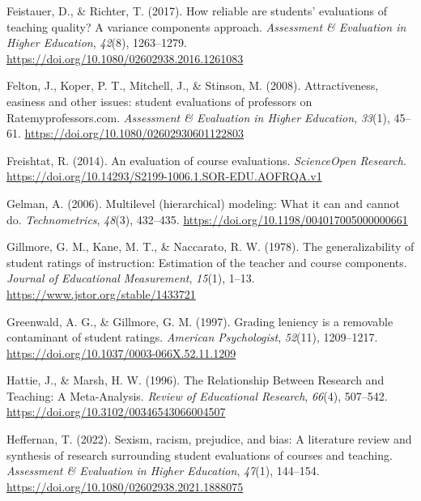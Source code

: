 \documentclass[
  man]{apa7}
\newlength{\cslhangindent}
\newlength{\cslentryspacingunit} %
\newenvironment{CSLReferences}[2] %
 {%
  \setlength{\parindent}{0pt}
  \ifodd #1
  \let\oldpar\par
  \def\par{\hangindent=\cslhangindent\oldpar}
  \fi
  \setlength{\parskip}{#2\cslentryspacingunit}
 }%
 {}
\begin{document}
\begin{CSLReferences}{1}{0}
\leavevmode{}%
Feistauer, D., \& Richter, T. (2017). How reliable are students{'} evaluations of teaching quality? A variance components approach. \emph{Assessment \& Evaluation in Higher Education}, \emph{42}(8), 1263--1279. \url{https://doi.org/10.1080/02602938.2016.1261083}

\leavevmode{}%
Felton, J., Koper, P. T., Mitchell, J., \& Stinson, M. (2008). Attractiveness, easiness and other issues: student evaluations of professors on Ratemyprofessors.com. \emph{Assessment \& Evaluation in Higher Education}, \emph{33}(1), 45--61. \url{https://doi.org/10.1080/02602930601122803}

\leavevmode{}%
Freishtat, R. (2014). An evaluation of course evaluations. \emph{ScienceOpen Research}. \url{https://doi.org/10.14293/S2199-1006.1.SOR-EDU.AOFRQA.v1}

\leavevmode{}%
Gelman, A. (2006). Multilevel (hierarchical) modeling: What it can and cannot do. \emph{Technometrics}, \emph{48}(3), 432--435. \url{https://doi.org/10.1198/004017005000000661}

\leavevmode{}%
Gillmore, G. M., Kane, M. T., \& Naccarato, R. W. (1978). The generalizability of student ratings of instruction: Estimation of the teacher and course components. \emph{Journal of Educational Measurement}, \emph{15}(1), 1--13. \url{https://www.jstor.org/stable/1433721}

\leavevmode{}%
Greenwald, A. G., \& Gillmore, G. M. (1997). Grading leniency is a removable contaminant of student ratings. \emph{American Psychologist}, \emph{52}(11), 1209--1217. \url{https://doi.org/10.1037/0003-066X.52.11.1209}

\leavevmode{}%
Hattie, J., \& Marsh, H. W. (1996). The Relationship Between Research and Teaching: A Meta-Analysis. \emph{Review of Educational Research}, \emph{66}(4), 507--542. \url{https://doi.org/10.3102/00346543066004507}

\leavevmode{}%
Heffernan, T. (2022). Sexism, racism, prejudice, and bias: A literature review and synthesis of research surrounding student evaluations of courses and teaching. \emph{Assessment \& Evaluation in Higher Education}, \emph{47}(1), 144--154. \url{https://doi.org/10.1080/02602938.2021.1888075}


\end{CSLReferences}
\end{document}
